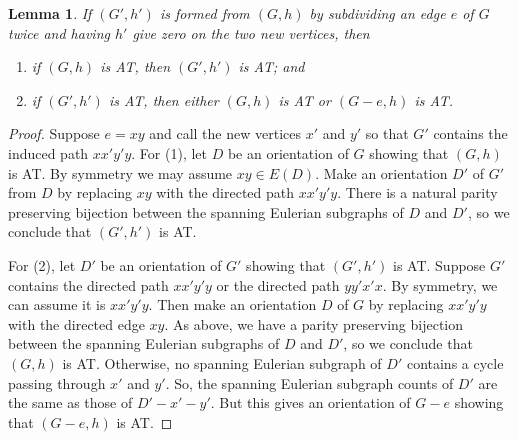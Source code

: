 \documentclass[12pt]{article}
\theoremstyle{plain}
\newtheorem{lem}[thm]{Lemma}
\theoremstyle{definition}
\theoremstyle{remark}
\begin{document}
\begin{lem}\label{SubdivideTwice}
	If $(G',h')$ is formed from $(G,h)$ by subdividing an edge $e$ of $G$ twice and having $h'$ give zero on the two new vertices, then
	\begin{enumerate}
		\item if $(G,h)$ is AT, then $(G', h')$ is AT; and
		\item if $(G', h')$ is AT, then either $(G,h)$ is AT or $(G-e,h)$ is AT.
	\end{enumerate}	
\end{lem}
\begin{proof}
	Suppose $e = xy$ and call the new vertices $x'$ and $y'$ so that $G'$ contains the induced path $xx'y'y$.	For (1), let $D$ be an orientation of $G$ showing that $(G,h)$ is AT. By symmetry we may assume $xy \in E(D)$. Make an orientation $D'$ of $G'$ from $D$ by replacing $xy$ with the directed path $xx'y'y$.  There is a natural parity preserving bijection between the spanning Eulerian subgraphs of $D$ and $D'$, so we conclude that $(G', h')$ is AT.
	
	For (2), let $D'$ be an orientation of $G'$ showing that $(G',h')$ is AT.  Suppose $G'$ contains the directed path $xx'y'y$ or the directed path $yy'x'x$.  By symmetry, we can assume it is $xx'y'y$.  Then make an orientation $D$ of $G$ by replacing $xx'y'y$ with the directed edge $xy$.  As above, we have a parity preserving bijection between the spanning Eulerian subgraphs of $D$ and $D'$, so we conclude that $(G, h)$ is AT.  Otherwise, no spanning Eulerian subgraph of $D'$ contains a cycle passing through $x'$ and $y'$.  So, the spanning Eulerian subgraph counts of $D'$ are the same as those of $D' - x' - y'$.  But this gives an orientation of $G-e$ showing that $(G-e, h)$ is AT.
\end{proof}
\end{document}
